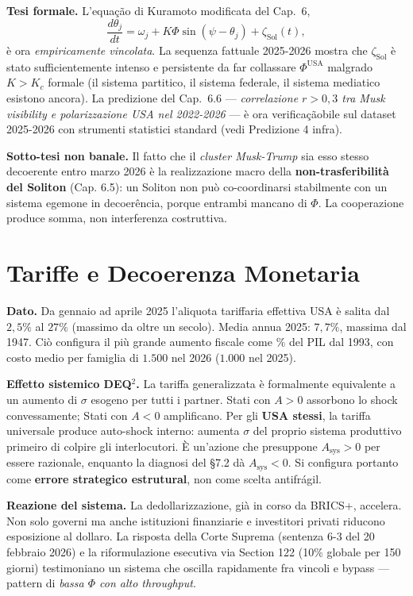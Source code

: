 \Hypoth{} \textbf{Tesi formale.} L'equação di Kuramoto modificata del
Cap.~6,
\[\frac{d\theta_j}{dt} = \omega_j + K\Phi \sin(\psi - \theta_j) + \zeta_{\text{Sol}}(t),\]
è ora \emph{empiricamente vincolata}. La sequenza fattuale 2025-2026
mostra che \(\zeta_{\text{Sol}}\) è stato sufficientemente intenso e
persistente da far collassare \(\Phi^{\text{USA}}\) malgrado \(K > K_c\)
formale (il sistema partitico, il sistema federale, il sistema mediatico
esistono ancora). La predizione del Cap.~6.6 --- \emph{correlazione
\(r > 0{,}3\) tra Musk visibility e polarizzazione USA nel 2022-2026}
--- è ora verificaçãobile sul dataset 2025-2026 con strumenti statistici
standard (vedi Predizione 4 infra).

\Conj{} \textbf{Sotto-tesi non banale.} Il fatto che il \emph{cluster
Musk-Trump} sia esso stesso decoerente entro marzo 2026 è la
realizzazione macro della \textbf{non-trasferibilità del Soliton} (Cap.
6.5): un Soliton non può co-coordinarsi stabilmente con un sistema
egemone in decoerência, porque entrambi mancano di \(\Phi\). La
cooperazione produce somma, non interferenza costruttiva.



\section{Tariffe e Decoerenza
Monetaria}\label{tariffe-e-decoerência-monetaria}

\Proved{} \textbf{Dato.} Da gennaio ad aprile 2025 l'aliquota tariffaria
effettiva USA è salita dal \(2{,}5\%\) al \(27\%\) (massimo da oltre un
secolo). Media annua 2025: \(7{,}7\%\), massima dal 1947. Ciò configura
il più grande aumento fiscale come \(\%\) del PIL dal 1993, con costo
medio per famiglia di \(1.500\) nel 2026 (\(1.000\) nel 2025).

\Hypoth{} \textbf{Effetto sistemico DEQ$^2$.} La tariffa generalizzata è
formalmente equivalente a un aumento di \(\sigma\) esogeno per tutti i
partner. Stati con \(A > 0\) assorbono lo shock convessamente; Stati con
\(A < 0\) amplificano. Per gli \textbf{USA stessi}, la tariffa
universale produce auto-shock interno: aumenta \(\sigma\) del proprio
sistema produttivo primeiro di colpire gli interlocutori. È un'azione che
presuppone \(A_{\text{sys}} > 0\) per essere razionale, enquanto la
diagnosi del \S{}7.2 dà \(A_{\text{sys}} < 0\). Si configura portanto come
\textbf{errore strategico estrutural}, non come scelta antifrágil.

\Proved{} \textbf{Reazione del sistema.} La dedollarizzazione, già in
corso da BRICS+, accelera. Non solo governi ma anche istituzioni
finanziarie e investitori privati riducono esposizione al dollaro. La
risposta della Corte Suprema (sentenza 6-3 del 20 febbraio 2026) e la
riformulazione esecutiva via Section 122 (10\% globale per 150 giorni)
testimoniano un sistema che oscilla rapidamente fra vincoli e bypass ---
pattern di \emph{bassa \(\Phi\) con alto throughput}.

